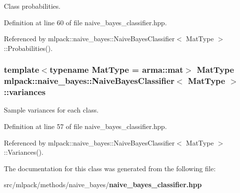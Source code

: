 Class probabilities. 



Definition at line 60 of file naive\-\_\-bayes\-\_\-classifier.\-hpp.



Referenced by mlpack\-::naive\-\_\-bayes\-::\-Naive\-Bayes\-Classifier$<$ Mat\-Type $>$\-::\-Probabilities().

\subsubsection[{variances}]{\setlength{\rightskip}{0pt plus 5cm}template$<$typename Mat\-Type  = arma\-::mat$>$ Mat\-Type {\bf mlpack\-::naive\-\_\-bayes\-::\-Naive\-Bayes\-Classifier}$<$ Mat\-Type $>$\-::variances\hspace{0.3cm}{\ttfamily [private]}}\label{classmlpack_1_1naive__bayes_1_1NaiveBayesClassifier_aea01921c2d5af0ca1d586d2427601a91}


Sample variances for each class. 



Definition at line 57 of file naive\-\_\-bayes\-\_\-classifier.\-hpp.



Referenced by mlpack\-::naive\-\_\-bayes\-::\-Naive\-Bayes\-Classifier$<$ Mat\-Type $>$\-::\-Variances().



The documentation for this class was generated from the following file\-:\begin{DoxyCompactItemize}
\item 
src/mlpack/methods/naive\-\_\-bayes/{\bf naive\-\_\-bayes\-\_\-classifier.\-hpp}\end{DoxyCompactItemize}
